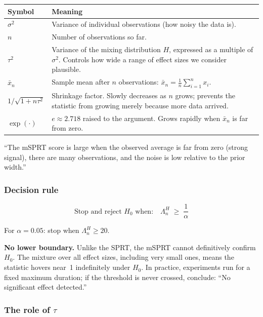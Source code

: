 \documentclass[12pt, a4paper]{article}
\newcommand{\LR}{\Lambda}              %
\begin{document}
\begin{center}
\renewcommand{\arraystretch}{1.4}
\begin{tabular}{@{} >{\raggedright}p{3cm} p{9cm} @{}}
\toprule
\textbf{Symbol} & \textbf{Meaning} \\
\midrule
$\sigma^2$ & Variance of individual observations (how noisy the data is). \\
$n$ & Number of observations so far. \\
$\tau^2$ & Variance of the mixing distribution $H$, expressed as a multiple
  of $\sigma^2$.  Controls how wide a range of effect sizes we consider
  plausible. \\
$\bar{x}_n$ & Sample mean after $n$ observations:
  $\bar{x}_n = \frac{1}{n}\sum_{i=1}^n x_i$. \\
$1/\sqrt{1 + n\tau^2}$ & Shrinkage factor.  Slowly decreases as $n$ grows;
  prevents the statistic from growing merely because more data arrived. \\
$\exp(\cdot)$ & $e \approx 2.718$ raised to the argument.  Grows rapidly
  when $\bar{x}_n$ is far from zero. \\
\bottomrule
\end{tabular}
\end{center}

\begin{plainlanguage}
``The mSPRT score is large when the observed average is far from zero (strong
signal), there are many observations, and the noise is low relative to the
prior width.''
\end{plainlanguage}

\subsubsection*{Decision rule}

\[
  \text{Stop and reject } H_0 \text{ when:} \quad
  \boxed{\LR_n^{H} \;\geq\; \frac{1}{\alpha}}
\]

For $\alpha = 0.05$: stop when $\LR_n^{H} \geq 20$.

\textbf{No lower boundary.}
Unlike the SPRT, the mSPRT cannot definitively confirm $H_0$.  The mixture
over all effect sizes, including very small ones, means the statistic hovers
near~1 indefinitely under $H_0$.  In practice, experiments run for a fixed
maximum duration; if the threshold is never crossed, conclude: ``No significant
effect detected.''

\subsubsection*{The role of $\tau$}
\end{document}
